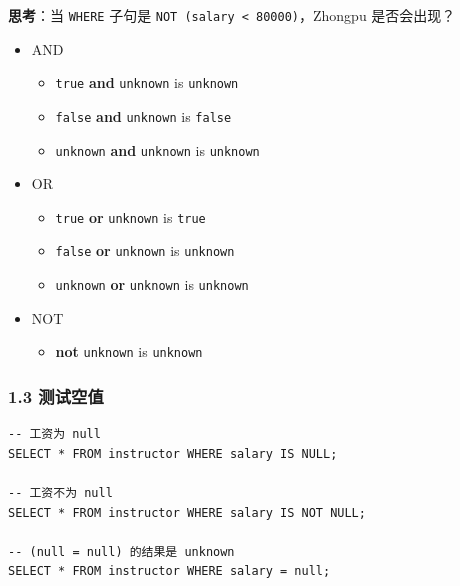 \documentclass[aspectratio=169, 14pt]{beamer}
\begin{document}
\begin{frame}
    \textbf{思考}：当 \texttt{WHERE} 子句是 \texttt{NOT (salary < 80000)}，Zhongpu 是否会出现？
\pause    
\begin{itemize}
    \item \alert{AND}
    \begin{itemize}
        \item \texttt{true} \textbf{and} \texttt{unknown} is \texttt{unknown} 
        \item \texttt{false} \textbf{and} \texttt{unknown} is \texttt{false}
        \item \texttt{unknown} \textbf{and} \texttt{unknown} is \texttt{unknown}
    \end{itemize}
    \item \alert{OR}
    \begin{itemize}
        \item \texttt{true} \textbf{or} \texttt{unknown} is \texttt{true}  
        \item \texttt{false} \textbf{or} \texttt{unknown} is \texttt{unknown}
        \item \texttt{unknown} \textbf{or} \texttt{unknown} is \texttt{unknown} 
    \end{itemize}
    \item \alert{NOT}
    \begin{itemize}
        \item \textbf{not} \texttt{unknown} is \texttt{unknown}
    \end{itemize}
\end{itemize}
\end{frame}

\begin{frame}[fragile]
    \frametitle{1.3 测试空值}

    \begin{verbatim}
-- 工资为 null
SELECT * FROM instructor WHERE salary IS NULL;

-- 工资不为 null
SELECT * FROM instructor WHERE salary IS NOT NULL;

-- (null = null) 的结果是 unknown
SELECT * FROM instructor WHERE salary = null;
    \end{verbatim} 

\end{frame}
\end{document}
